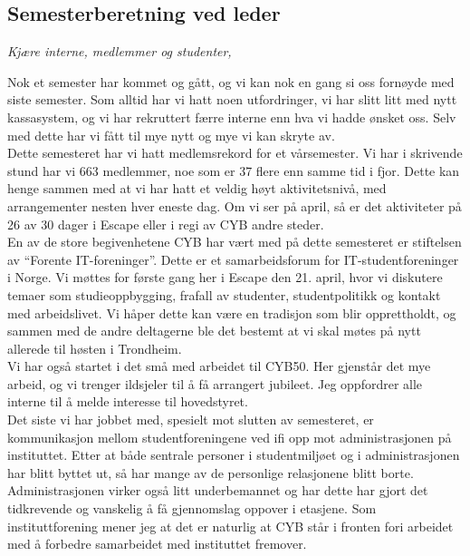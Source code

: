 \documentclass[10pt,norsk,a4paper]{article}
\begin{document}
\subsection{Semesterberetning ved leder}
\textit{Kjære interne, medlemmer og studenter,}
\begin{multicols}{2}
Nok et semester har kommet og gått, og vi kan nok en gang si oss fornøyde med siste semester. Som alltid har vi hatt noen utfordringer, vi har slitt litt med nytt kassasystem, og vi har rekruttert færre interne enn hva vi hadde ønsket oss. Selv med dette har vi fått til mye nytt og mye vi kan skryte av.\\

Dette semesteret har vi hatt medlemsrekord for et vårsemester. Vi har i skrivende stund har vi 663 medlemmer, noe som er 37 flere enn samme tid i fjor. Dette kan henge sammen med at vi har hatt et veldig høyt aktivitetsnivå, med arrangementer nesten hver eneste dag. Om vi ser på april, så er det aktiviteter på 26 av 30 dager i Escape eller i regi av CYB andre steder.\\

En av de store begivenhetene CYB har vært med på dette semesteret er stiftelsen av “Forente IT-foreninger”. Dette er et samarbeidsforum for IT-studentforeninger i Norge. Vi møttes for første gang her i Escape den 21. april, hvor vi diskutere temaer som studieoppbygging, frafall av studenter, studentpolitikk og kontakt med arbeidslivet. Vi håper dette kan være en tradisjon som blir opprettholdt, og sammen med de andre deltagerne ble det bestemt at vi skal møtes på nytt allerede til høsten i Trondheim.\\

Vi har også startet i det små med arbeidet til CYB50. Her gjenstår det mye arbeid, og vi trenger ildsjeler til å få arrangert jubileet. Jeg oppfordrer alle interne til å melde interesse til hovedstyret.\\

Det siste vi har jobbet med, spesielt mot slutten av semesteret, er kommunikasjon mellom studentforeningene ved ifi opp mot administrasjonen på instituttet. Etter at både sentrale personer i studentmiljøet og i administrasjonen har blitt byttet ut, så har mange av de personlige relasjonene blitt borte. Administrasjonen virker også litt underbemannet og har dette har gjort det tidkrevende og vanskelig å få gjennomslag oppover i etasjene. Som instituttforening mener jeg at det er naturlig at CYB står i fronten fori arbeidet med å forbedre samarbeidet med instituttet fremover. 

\end{multicols}
\end{document}
